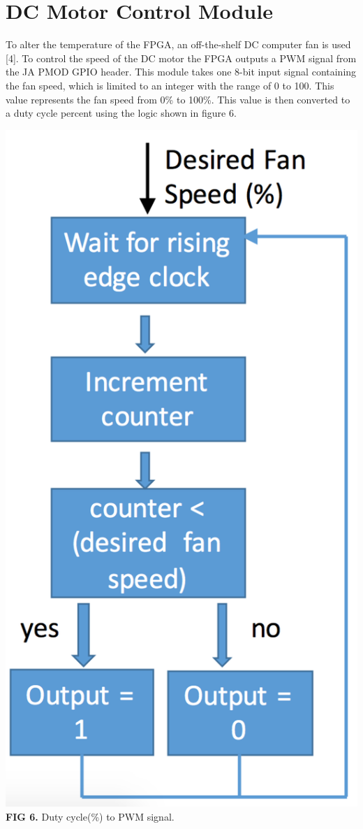 \documentclass{article}
\begin{document}
\section{DC Motor Control Module}
To alter the temperature of the FPGA, an off-the-shelf DC computer fan is used [4]. To control the speed of the DC motor the FPGA outputs a PWM signal from the JA PMOD GPIO header. This module takes one 8-bit input signal containing the fan speed, which is limited to an integer with the range of 0 to 100. This value represents the fan speed from 0\% to 100\%. This value is then converted to a duty cycle percent using the logic shown in figure 6.
\begin{center}
\includegraphics[scale=.4]{images/dutyPWM}\\
\textbf{FIG 6.} Duty cycle(\%) to PWM signal.\\
\end{center}
\end{document}
